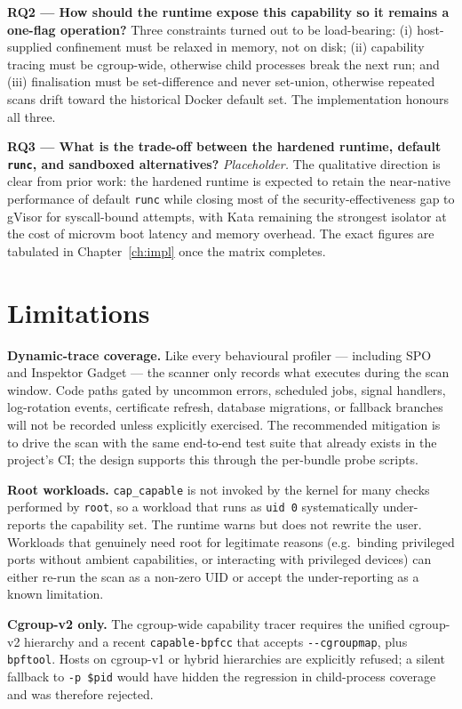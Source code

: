 \textbf{RQ2 --- How should the runtime expose this capability so it remains a one-flag operation?} Three constraints turned out to be load-bearing: (i) host-supplied confinement must be relaxed in memory, not on disk; (ii) capability tracing must be cgroup-wide, otherwise child processes break the next run; and (iii) finalisation must be set-difference and never set-union, otherwise repeated scans drift toward the historical Docker default set. The implementation honours all three.

\textbf{RQ3 --- What is the trade-off between the hardened runtime, default \texttt{runc}, and sandboxed alternatives?} \emph{Placeholder.} The qualitative direction is clear from prior work: the hardened runtime is expected to retain the near-native performance of default \texttt{runc} while closing most of the security-effectiveness gap to gVisor for syscall-bound attempts, with Kata remaining the strongest isolator at the cost of microvm boot latency and memory overhead. The exact figures are tabulated in Chapter~\ref{ch:impl} once the matrix completes.

\section{Limitations}

\textbf{Dynamic-trace coverage.} Like every behavioural profiler --- including SPO and Inspektor Gadget --- the scanner only records what executes during the scan window. Code paths gated by uncommon errors, scheduled jobs, signal handlers, log-rotation events, certificate refresh, database migrations, or fallback branches will not be recorded unless explicitly exercised. The recommended mitigation is to drive the scan with the same end-to-end test suite that already exists in the project's CI; the design supports this through the per-bundle probe scripts.

\textbf{Root workloads.} \texttt{cap\_capable} is not invoked by the kernel for many checks performed by \texttt{root}, so a workload that runs as \texttt{uid 0} systematically under-reports the capability set. The runtime warns but does not rewrite the user. Workloads that genuinely need root for legitimate reasons (e.g.\ binding privileged ports without ambient capabilities, or interacting with privileged devices) can either re-run the scan as a non-zero UID or accept the under-reporting as a known limitation.

\textbf{Cgroup-v2 only.} The cgroup-wide capability tracer requires the unified cgroup-v2 hierarchy and a recent \texttt{capable-bpfcc} that accepts \texttt{-{}-cgroupmap}, plus \texttt{bpftool}. Hosts on cgroup-v1 or hybrid hierarchies are explicitly refused; a silent fallback to \texttt{-p \$pid} would have hidden the regression in child-process coverage and was therefore rejected.

